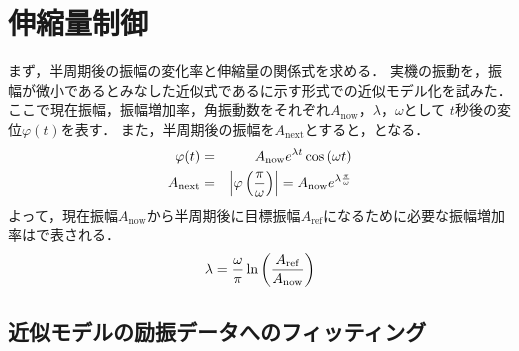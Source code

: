           \section{伸縮量制御}

          まず，半周期後の振幅の変化率と伸縮量の関係式を求める．
          実機の振動を，振幅が微小であるとみなした近似式であるに示す形式での近似モデル化を試みた．
          ここで現在振幅，振幅増加率，角振動数をそれぞれ$A_{\mathrm{now}}$，$\lambda$，$\omega$として
          $t$秒後の変位$\varphi(t)$を表す．
          また，半周期後の振幅を$A_{\mathrm{next}}$とすると，となる．
          \begin{eqnarray}
            \equlabel{Approximation Model}
            \varphi(t)&=&A_{\mathrm{now}}e^{\lambda t}\cos{(\omega t)}\\
            \equlabel{amp rate}
            A_{\mathrm{next}}&=&\left|\varphi\left(\frac{\pi}{\omega}\right)\right|=A_{\mathrm{now}}e^{\lambda \frac{\pi}{\omega}}
          \end{eqnarray}
          よって，現在振幅$A_{\mathrm{now}}$から半周期後に目標振幅$A_{\mathrm{ref}}$になるために必要な振幅増加率はで表される．
          \begin{eqnarray}
            \equlabel{lambda}
            \lambda=\frac{\omega}{\pi}\ln{\left(\frac{A_{\mathrm{ref}}}{A_{\mathrm{now}}}\right)}
          \end{eqnarray}

        \subsection{近似モデルの励振データへのフィッティング}
          
